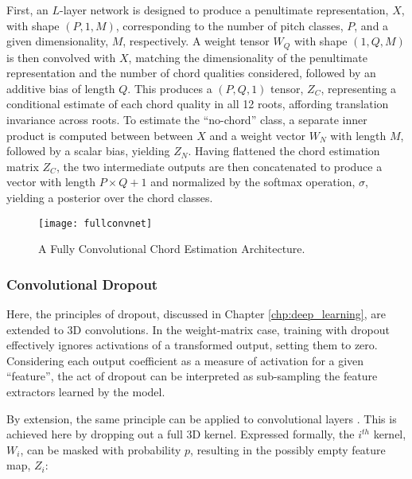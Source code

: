 \noindent First, an $L$-layer network is designed to produce a penultimate representation, $X$, with shape $(P, 1, M)$, corresponding to the number of pitch classes, $P$, and a given dimensionality, $M$, respectively.
A weight tensor $W_Q$ with shape $(1, Q, M)$ is then convolved with $X$, matching the dimensionality of the penultimate representation and the number of chord qualities considered, followed by an additive bias of length $Q$.
This produces a $(P, Q, 1)$ tensor, $Z_C$, representing a conditional estimate of each chord quality in all 12 roots, affording translation invariance across roots.
To estimate the ``no-chord'' class, a separate inner product is computed between between $X$ and a weight vector $W_N$ with length $M$, followed by a scalar bias, yielding $Z_N$.
Having flattened the chord estimation matrix $Z_C$, the two intermediate outputs are then concatenated to produce a vector with length $P \times Q + 1$ and normalized by the softmax operation, $\sigma$, yielding a posterior over the chord classes.

\begin{figure}[!t]
\centering
\texttt{[image: fullconvnet]}
\caption{A Fully Convolutional Chord Estimation Architecture.}
\label{fig:fullconvnet}
\end{figure}

\subsubsection{Convolutional Dropout}
\label{subsubsec:conv_dropout}

Here, the principles of dropout, discussed in Chapter \ref{chp:deep_learning}, are extended to 3D convolutions.
In the weight-matrix case, training with dropout effectively ignores activations of a transformed output, setting them to zero.
Considering each output coefficient as a measure of activation for a given ``feature'', the act of dropout can be interpreted as sub-sampling the feature extractors learned by the model.

By extension, the same principle can be applied to convolutional layers \cite{Srivastava2014Dropout, Goodfellow2013Maxout}.
This is achieved here by dropping out a full 3D kernel.
Expressed formally, the $i^{th}$ kernel, $W_i$, can be masked with probability $p$, resulting in the possibly empty feature map, $Z_i$:

